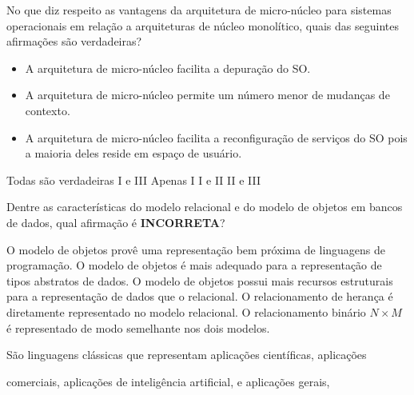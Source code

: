 \documentclass[12pt, addpoints]{exam}
\begin{document}
    \begin{questions}

    \newpage
    \question

No que diz respeito as vantagens da arquitetura de micro-núcleo para sistemas operacionais em relação a arquiteturas de núcleo monolítico, quais das seguintes afirmações são verdadeiras?



\begin{itemize}

    \item[I] A arquitetura de micro-núcleo facilita a depuração do SO.

    \item[II] A arquitetura de micro-núcleo permite um número menor de mudanças de contexto.

    \item[III] A arquitetura de micro-núcleo facilita a reconfiguração de serviços do SO pois a maioria deles reside em espaço de usuário.

\end{itemize}
\begin{choices}
\choice Todas são verdadeiras
\choice I e III
\choice Apenas I
\choice I e II
\choice II e III
\end{choices}

\question

Dentre as características do modelo relacional e do modelo de objetos em bancos de dados, qual afirmação é \textbf{INCORRETA}?


\begin{choices}
\choice O modelo de objetos provê uma representação bem próxima de linguagens de programação.
\choice O modelo de objetos é mais adequado para a representação de tipos abstratos de dados.
\choice O modelo de objetos possui mais recursos estruturais para a representação de dados que o relacional.
\choice O relacionamento de herança é diretamente representado no modelo relacional.
\choice O relacionamento binário \( N \times M \) é representado de modo semelhante nos dois modelos.	
\end{choices}

\question

São linguagens clássicas que representam aplicações científicas, aplicações 

comerciais, aplicações de inteligência artificial, e aplicações gerais,


\end{questions}
\end{document}
